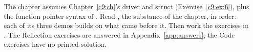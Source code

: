 The chapter assumes Chapter~\ref{c9:ch}'s  driver and  struct
(Exercise~\ref{c9:ex:6}), plus the function pointer syntax of . Read
, the substance of the chapter, in order: each of its three demos
builds on what came before it. Then work the exercises in . The
Reflection exercises are answered in Appendix~\ref{app:answers}; the Code exercises have no
printed solution.




